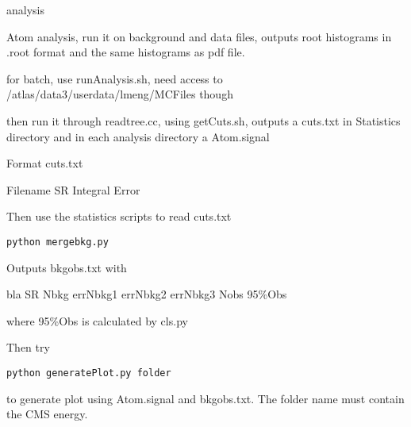 analysis

Atom analysis, run it on background and data files, outputs root histograms in .root format and the same histograms as pdf file.

for batch, use runAnalysis.sh, need access to /atlas/data3/userdata/lmeng/MCFiles though

then run it through readtree.cc, using getCuts.sh, outputs a cuts.txt in Statistics directory and in each analysis directory a Atom.signal

Format cuts.txt

Filename SR Integral Error

Then use the statistics scripts to read cuts.txt

\lstinline|python mergebkg.py|

Outputs bkgobs.txt with

bla SR Nbkg errNbkg1 errNbkg2 errNbkg3 Nobs 95\%Obs

where 95\%Obs is calculated by cls.py

Then try 


\lstinline|python generatePlot.py folder|

to generate plot using Atom.signal and bkgobs.txt. The folder name must contain the CMS energy.



